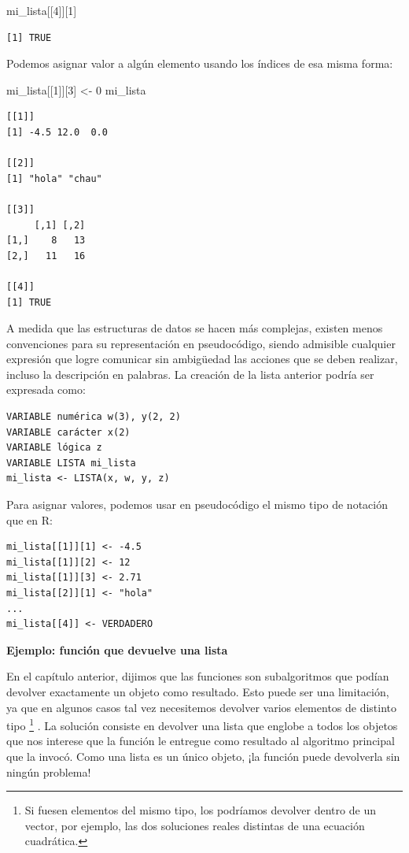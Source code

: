 \documentclass[
]{book}
\newenvironment{Shaded}{\begin{snugshade}}{\end{snugshade}}
\newcommand{\DecValTok}[1]{\textcolor[rgb]{0.00,0.00,0.81}{#1}}
\newcommand{\NormalTok}[1]{#1}
\newcommand{\OtherTok}[1]{\textcolor[rgb]{0.56,0.35,0.01}{#1}}
\begin{document}
\begin{Shaded}
\begin{Highlighting}[]
\NormalTok{mi\_lista[[}\DecValTok{4}\NormalTok{]][}\DecValTok{1}\NormalTok{]}
\end{Highlighting}
\end{Shaded}

\begin{verbatim}
[1] TRUE
\end{verbatim}

Podemos asignar valor a algún elemento usando los índices de esa misma forma:

\begin{Shaded}
\begin{Highlighting}[]
\NormalTok{mi\_lista[[}\DecValTok{1}\NormalTok{]][}\DecValTok{3}\NormalTok{] }\OtherTok{\textless{}{-}} \DecValTok{0}
\NormalTok{mi\_lista}
\end{Highlighting}
\end{Shaded}

\begin{verbatim}
[[1]]
[1] -4.5 12.0  0.0

[[2]]
[1] "hola" "chau"

[[3]]
     [,1] [,2]
[1,]    8   13
[2,]   11   16

[[4]]
[1] TRUE
\end{verbatim}

A medida que las estructuras de datos se hacen más complejas, existen menos convenciones para su representación en pseudocódigo, siendo admisible cualquier expresión que logre comunicar sin ambigüedad las acciones que se deben realizar, incluso la descripción en palabras. La creación de la lista anterior podría ser expresada como:

\begin{verbatim}
VARIABLE numérica w(3), y(2, 2)
VARIABLE carácter x(2)
VARIABLE lógica z
VARIABLE LISTA mi_lista
mi_lista <- LISTA(x, w, y, z)
\end{verbatim}

Para asignar valores, podemos usar en pseudocódigo el mismo tipo de notación que en R:

\begin{verbatim}
mi_lista[[1]][1] <- -4.5
mi_lista[[1]][2] <- 12
mi_lista[[1]][3] <- 2.71
mi_lista[[2]][1] <- "hola"
...
mi_lista[[4]] <- VERDADERO
\end{verbatim}

\textbf{Ejemplo: función que devuelve una lista}

En el capítulo anterior, dijimos que las funciones son subalgoritmos que podían devolver exactamente un objeto como resultado. Esto puede ser una limitación, ya que en algunos casos tal vez necesitemos devolver varios elementos de distinto tipo
\footnote{Si fuesen elementos del mismo tipo, los podríamos devolver dentro de un vector, por ejemplo, las dos soluciones reales distintas de una ecuación cuadrática.}
.
La solución consiste en devolver una lista que englobe a todos los objetos que nos interese que la función le entregue como resultado al algoritmo principal que la invocó. Como una lista es un único objeto, ¡la función puede devolverla sin ningún problema!
\end{document}
